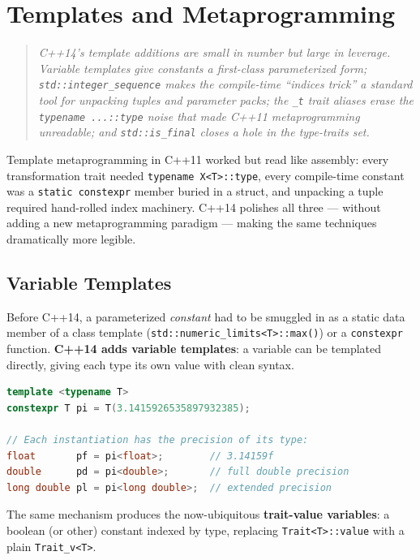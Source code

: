 \chapter{Templates and Metaprogramming}
\label{ch:c14-templates-metaprogramming}

\begin{quote}
\emph{C++14's template additions are small in number but large in leverage. Variable templates give constants a first-class parameterized form; \texttt{std::integer\_sequence} makes the compile-time ``indices trick'' a standard tool for unpacking tuples and parameter packs; the \texttt{\_t} trait aliases erase the \texttt{typename ...::type} noise that made C++11 metaprogramming unreadable; and \texttt{std::is\_final} closes a hole in the type-traits set.}
\end{quote}

Template metaprogramming in C++11 worked but read like assembly: every transformation trait needed \texttt{typename X<T>::type}, every compile-time constant was a \texttt{static constexpr} member buried in a struct, and unpacking a tuple required hand-rolled index machinery. C++14 polishes all three --- without adding a new metaprogramming paradigm --- making the same techniques dramatically more legible.

\section{Variable Templates}
\label{sec:c14-variable-templates}

Before C++14, a parameterized \emph{constant} had to be smuggled in as a static data member of a class template (\texttt{std::numeric\_limits<T>::max()}) or a \texttt{constexpr} function. \textbf{C++14 adds variable templates}: a variable can be templated directly, giving each type its own value with clean syntax.

\begin{lstlisting}[language=C++,caption={A variable template}]
template <typename T>
constexpr T pi = T(3.1415926535897932385);

// Each instantiation has the precision of its type:
float       pf = pi<float>;        // 3.14159f
double      pd = pi<double>;       // full double precision
long double pl = pi<long double>;  // extended precision
\end{lstlisting}

The same mechanism produces the now-ubiquitous \textbf{trait-value variables}: a boolean (or other) constant indexed by type, replacing \texttt{Trait<T>::value} with a plain \texttt{Trait\_v<T>}.

